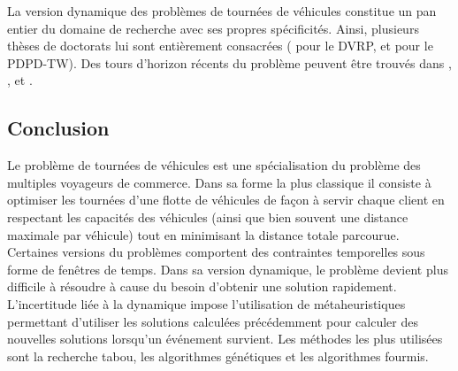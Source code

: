 La version dynamique des problèmes de tournées de véhicules constitue un pan entier du domaine de recherche avec ses propres spécificités. Ainsi, plusieurs thèses de doctorats lui sont entièrement consacrées (\cite{Larsen2000} pour le DVRP, et \cite{Mitrovic-Minic2001} pour le PDPD-TW). Des tours d'horizon récents du problème peuvent être trouvés dans \cite{Gendreau2008}, \cite{Larsen2008}, \cite{Berbeglia2010} et \cite{Pillac2011}.

\subsection*{Conclusion}

Le problème de tournées de véhicules est une spécialisation du problème des multiples voyageurs de commerce. Dans sa forme la plus classique il consiste à optimiser les tournées d'une flotte de véhicules de façon à servir chaque client en respectant les capacités des véhicules (ainsi que bien souvent une distance maximale par véhicule) tout en minimisant la distance totale parcourue. Certaines versions du problèmes comportent des contraintes temporelles sous forme de fenêtres de temps.
Dans sa version dynamique, le problème devient plus difficile à résoudre à cause du besoin d'obtenir une solution rapidement. L'incertitude liée à la dynamique impose l'utilisation de métaheuristiques permettant d'utiliser les solutions calculées précédemment pour calculer des nouvelles solutions lorsqu'un événement survient. Les méthodes les plus utilisées sont la recherche tabou, les algorithmes génétiques et les algorithmes fourmis.

